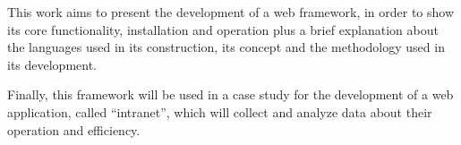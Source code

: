 This work aims to present the development of a web framework, in order to show its core functionality, installation and operation plus a brief explanation about the languages ​​used in its construction, its concept and the methodology used in its development. 

Finally, this framework will be used in a case study for the development of a web application, called ``intranet'', which will collect and analyze data about their operation and efficiency.